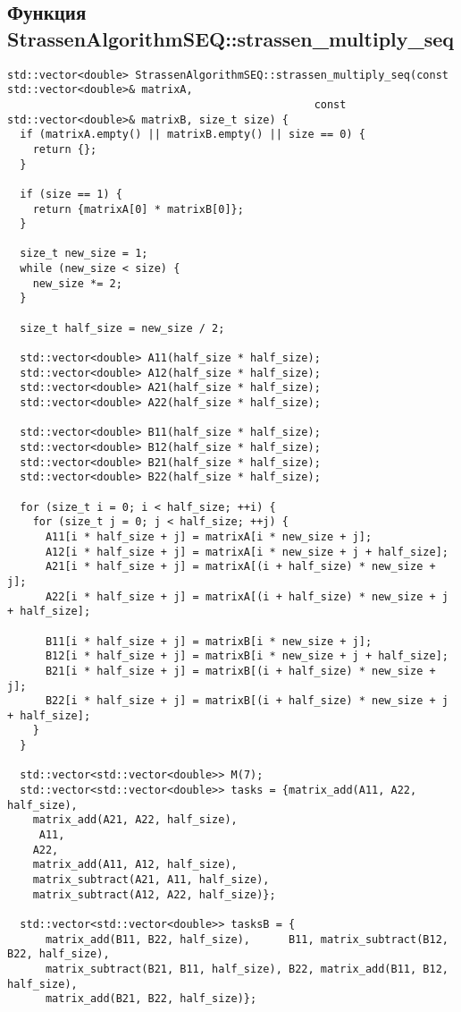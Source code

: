 \documentclass{report}
\begin{document}
\subsection*{Функция StrassenAlgorithmSEQ::strassen\_multiply\_seq}
\begin{lstlisting}
std::vector<double> StrassenAlgorithmSEQ::strassen_multiply_seq(const std::vector<double>& matrixA,
                                                const std::vector<double>& matrixB, size_t size) {
  if (matrixA.empty() || matrixB.empty() || size == 0) {
    return {};
  }

  if (size == 1) {
    return {matrixA[0] * matrixB[0]};
  }

  size_t new_size = 1;
  while (new_size < size) {
    new_size *= 2;
  }

  size_t half_size = new_size / 2;

  std::vector<double> A11(half_size * half_size);
  std::vector<double> A12(half_size * half_size);
  std::vector<double> A21(half_size * half_size);
  std::vector<double> A22(half_size * half_size);

  std::vector<double> B11(half_size * half_size);
  std::vector<double> B12(half_size * half_size);
  std::vector<double> B21(half_size * half_size);
  std::vector<double> B22(half_size * half_size);

  for (size_t i = 0; i < half_size; ++i) {
    for (size_t j = 0; j < half_size; ++j) {
      A11[i * half_size + j] = matrixA[i * new_size + j];
      A12[i * half_size + j] = matrixA[i * new_size + j + half_size];
      A21[i * half_size + j] = matrixA[(i + half_size) * new_size + j];
      A22[i * half_size + j] = matrixA[(i + half_size) * new_size + j + half_size];

      B11[i * half_size + j] = matrixB[i * new_size + j];
      B12[i * half_size + j] = matrixB[i * new_size + j + half_size];
      B21[i * half_size + j] = matrixB[(i + half_size) * new_size + j];
      B22[i * half_size + j] = matrixB[(i + half_size) * new_size + j + half_size];
    }
  }

  std::vector<std::vector<double>> M(7);
  std::vector<std::vector<double>> tasks = {matrix_add(A11, A22, half_size),
    matrix_add(A21, A22, half_size),
     A11,
    A22,
    matrix_add(A11, A12, half_size),
    matrix_subtract(A21, A11, half_size),
    matrix_subtract(A12, A22, half_size)};

  std::vector<std::vector<double>> tasksB = {
      matrix_add(B11, B22, half_size),      B11, matrix_subtract(B12, B22, half_size),
      matrix_subtract(B21, B11, half_size), B22, matrix_add(B11, B12, half_size),
      matrix_add(B21, B22, half_size)};


\end{lstlisting}
\end{document}
